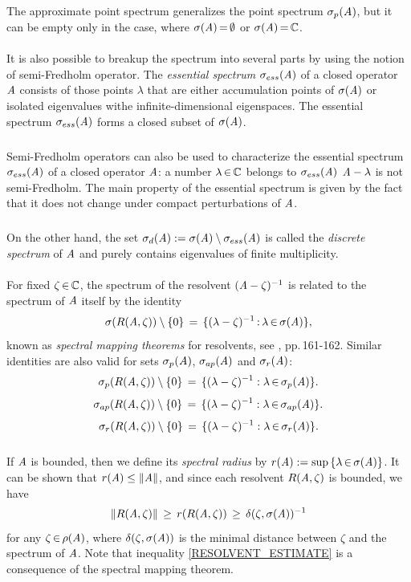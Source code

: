 \documentclass[11pt,twoside]{article}
\begin{document}
\subparagraph*{}
The approximate point spectrum generalizes
the point spectrum $\sigma_p(\mathit{A})$,
but it can be empty only in the case,
where $\sigma(\mathit{A}) {\,=\,} \emptyset$ or $\sigma(\mathit{A}) {\,=\,} {\mathbb{C}}$.

\paragraph*{}
It is also possible to breakup the spectrum into several parts
by using the notion of semi-Fredholm operator.
The \textit{essential spectrum} $\sigma_{ess}(\mathit{A})$
of a closed operator $\mathit{A}$ consists of those points $\lambda$
that are either accumulation points of $\sigma(\mathit{A})$
or isolated eigenvalues withe infinite-dimensional eigenspaces.
The essential spectrum $\sigma_{ess}(\mathit{A})$ forms
a closed subset of $\sigma(\mathit{A})$.

\subparagraph*{}
Semi-Fredholm operators can also be used to characterize
the essential spectrum $\sigma_{ess}(\mathit{A})$
of a closed operator $\mathit{A}$:
a number $\lambda {\,\in\,} {\mathbb{C}}$ belongs to $\sigma_{ess}(\mathit{A})$
\iff $\mathit{A} - \lambda$ is not semi-Fredholm.
The main property of the essential spectrum is given by the fact
that it does not change under compact perturbations of $\mathit{A}$.

\subparagraph*{}
On the other hand,
the set
$\sigma_d(\mathit{A}) := \sigma(\mathit{A}) \setminus \sigma_{ess}(\mathit{A})$
is called the \textit{discrete spectrum} of $\mathit{A}$
and purely contains eigenvalues of finite multiplicity.

\paragraph*{}
For fixed $\zeta {\,\in\,} {\mathbb{C}}$,
the spectrum of the resolvent $(\mathit{A} - \zeta)^{-1}$ 
is related to the spectrum of $\mathit{A}$ itself by the identity
\[
\sigma(R(\mathit{A},\zeta)) \setminus \{0\} \,=\,
\{(\lambda-\zeta)^{-1} {\,:\,} \lambda {\,\in\,} \sigma(\mathit{A})\},
\]
known as \textit{spectral mapping theorems} for resolvents,
see \cite{EN}, pp.\,161-162.
Similar identities are also valid for sets $\sigma_p(\mathit{A})$,
$\sigma_{ap}(\mathit{A})$ and $\sigma_r(\mathit{A})$:
\[
\sigma_p(R(\mathit{A},\zeta)) \setminus \{0\} \,=\,
\{(\lambda-\zeta)^{-1}: \lambda {\,\in\,} \sigma_p(\mathit{A})\}.
\]
\[
\sigma_{ap}(R(\mathit{A},\zeta)) \setminus \{0\} \,=\,
\{(\lambda-\zeta)^{-1}: \lambda {\,\in\,} \sigma_{ap}(\mathit{A})\}.
\]
\[
\sigma_r(R(\mathit{A},\zeta)) \setminus \{0\} \,=\,
\{(\lambda-\zeta)^{-1}: \lambda {\,\in\,} \sigma_r(\mathit{A})\}.
\]

\subparagraph*{} %
If $\mathit{A}$ is bounded,
then we define its \textit{spectral radius} by
$r(\mathit{A}) := \sup \, \{\lambda {\,\in\,} \sigma(\mathit{A})\}$.
It can be shown that $r(\mathit{A}) \leq \left\lVert \mathit{A} \right\rVert$,
and since each resolvent $R(\mathit{A},\zeta)$ is bounded,
we have
\begin{equation}\label{RESOLVENT_ESTIMATE}
\left\lVert R(\mathit{A},\zeta) \right\rVert \, \geq \,
r(R(\mathit{A},\zeta))     \, \geq \,
\delta(\zeta,\sigma(\mathit{A}))^{-1}
\end{equation}
for any $\zeta {\,\in\,} \rho(\mathit{A})$,
where $\delta(\zeta,\sigma(\mathit{A}))$ is the minimal distance between
$\zeta$ and the spectrum of $\mathit{A}$.
Note that inequality \eqref{RESOLVENT_ESTIMATE} is a consequence
of the spectral mapping theorem.
\end{document}
